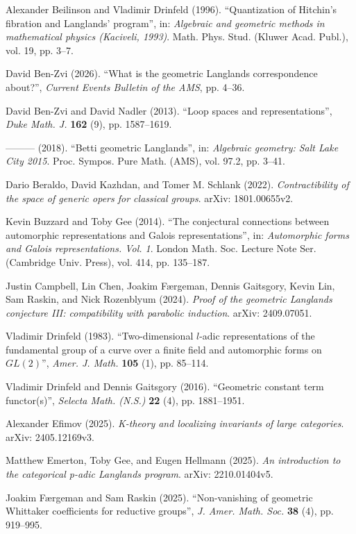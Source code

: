 \begin{list}{}{\setlength{\leftmargin}{2em}\setlength{\itemindent}{-2em}\setlength{\labelwidth}{0pt}\setlength{\labelsep}{0pt}\setlength{\itemsep}{0.3em}\setlength{\parsep}{0pt}\setlength{\topsep}{0.4em}}
\item Alexander Beilinson and Vladimir Drinfeld (1996). “Quantization of Hitchin's fibration and Langlands' program”, in: \textit{Algebraic and geometric methods in mathematical physics (Kaciveli, 1993)}. Math. Phys. Stud. (Kluwer Acad. Publ.), vol. 19, pp. 3–7.
\item David Ben-Zvi (2026). “What is the geometric Langlands correspondence about?”, \textit{Current Events Bulletin of the AMS}, pp. 4–36.
\item David Ben-Zvi and David Nadler (2013). “Loop spaces and representations”, \textit{Duke Math. J.} \textbf{162} (9), pp. 1587–1619.
\item ——— (2018). “Betti geometric Langlands”, in: \textit{Algebraic geometry: Salt Lake City 2015}. Proc. Sympos. Pure Math. (AMS), vol. 97.2, pp. 3–41.
\item Dario Beraldo, David Kazhdan, and Tomer M. Schlank (2022). \textit{Contractibility of the space of generic opers for classical groups}. arXiv: 1801.00655v2.
\item Kevin Buzzard and Toby Gee (2014). “The conjectural connections between automorphic representations and Galois representations”, in: \textit{Automorphic forms and Galois representations. Vol. 1}. London Math. Soc. Lecture Note Ser. (Cambridge Univ. Press), vol. 414, pp. 135–187.
\item Justin Campbell, Lin Chen, Joakim Færgeman, Dennis Gaitsgory, Kevin Lin, Sam Raskin, and Nick Rozenblyum (2024). \textit{Proof of the geometric Langlands conjecture III: compatibility with parabolic induction}. arXiv: 2409.07051.
\item Vladimir Drinfeld (1983). “Two-dimensional $l$-adic representations of the fundamental group of a curve over a finite field and automorphic forms on $GL(2)$”, \textit{Amer. J. Math.} \textbf{105} (1), pp. 85–114.
\item Vladimir Drinfeld and Dennis Gaitsgory (2016). “Geometric constant term functor(s)”, \textit{Selecta Math. (N.S.)} \textbf{22} (4), pp. 1881–1951.
\item Alexander Efimov (2025). \textit{K-theory and localizing invariants of large categories}. arXiv: 2405.12169v3.
\item Matthew Emerton, Toby Gee, and Eugen Hellmann (2025). \textit{An introduction to the categorical p-adic Langlands program}. arXiv: 2210.01404v5.
\item Joakim Færgeman and Sam Raskin (2025). “Non-vanishing of geometric Whittaker coefficients for reductive groups”, \textit{J. Amer. Math. Soc.} \textbf{38} (4), pp. 919–995.

\end{list}
